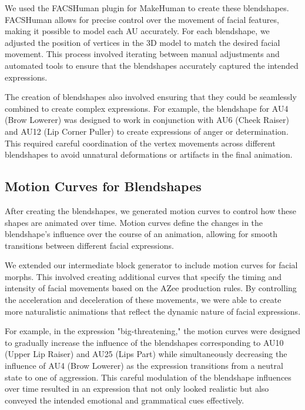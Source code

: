 \documentclass[../../main.tex]{subfiles}
\begin{document}
We used the FACSHuman plugin for MakeHuman to create these blendshapes. FACSHuman allows for precise control over the movement of facial features, making it possible to model each AU accurately. For each blendshape, we adjusted the position of vertices in the 3D model to match the desired facial movement. This process involved iterating between manual adjustments and automated tools to ensure that the blendshapes accurately captured the intended expressions.

The creation of blendshapes also involved ensuring that they could be seamlessly combined to create complex expressions. For example, the blendshape for AU4 (Brow Lowerer) was designed to work in conjunction with AU6 (Cheek Raiser) and AU12 (Lip Corner Puller) to create expressions of anger or determination. This required careful coordination of the vertex movements across different blendshapes to avoid unnatural deformations or artifacts in the final animation.

\subsection{Motion Curves for Blendshapes}
\label{ch:facial_expressions:motion_curves_for_blendshapes}

After creating the blendshapes, we generated motion curves to control how these shapes are animated over time. Motion curves define the changes in the blendshape's influence over the course of an animation, allowing for smooth transitions between different facial expressions.

We extended our intermediate block generator to include motion curves for facial morphs. This involved creating additional curves that specify the timing and intensity of facial movements based on the AZee production rules. By controlling the acceleration and deceleration of these movements, we were able to create more naturalistic animations that reflect the dynamic nature of facial expressions.

For example, in the expression "big-threatening," the motion curves were designed to gradually increase the influence of the blendshapes corresponding to AU10 (Upper Lip Raiser) and AU25 (Lips Part) while simultaneously decreasing the influence of AU4 (Brow Lowerer) as the expression transitions from a neutral state to one of aggression. This careful modulation of the blendshape influences over time resulted in an expression that not only looked realistic but also conveyed the intended emotional and grammatical cues effectively.
\end{document}

